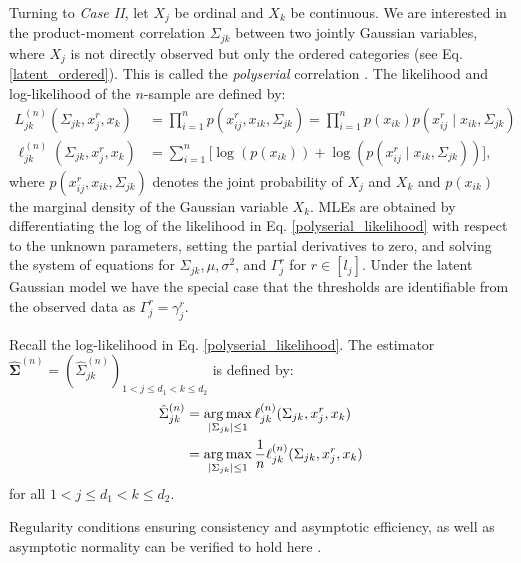 Turning to \textit{Case II}, let $X_j$ be ordinal and $X_k$ be continuous. We are interested in the product-moment correlation $\Sigma_{jk}$ between two jointly Gaussian variables, where $X_j$ is not directly observed but only the ordered categories (see Eq. \eqref{latent_ordered}). This is called the \textit{polyserial} correlation \citep{Olsson82}. The likelihood and log-likelihood of the $n$-sample are defined by:
\begin{equation}\label{polyserial_likelihood}
    \begin{split}
        L_{jk}^{(n)}(\Sigma_{jk}, x_j^r,x_k) &= \prod_{i=1}^n p(x^r_{ij},x_{ik}, \Sigma_{jk}) = \prod_{i=1}^n p(x_{ik})p(x^r_{ij} \mid x_{ik}, \Sigma_{jk}) \\
        \ell_{jk}^{(n)}(\Sigma_{jk}, x^r_j,x_k) &= \sum_{i=1}^n \big[\log(p(x_{ik})) + \log(p(x^r_{ij} \mid x_{ik}, \Sigma_{jk}))\big],
    \end{split}
\end{equation}
where $p(x_{ij}^{r},x_{ik}, \Sigma_{jk})$ denotes the joint probability of  $X_j$ and $X_k$ and $p(x_{ik})$ the marginal density of the Gaussian variable $X_k$. MLEs are obtained by differentiating the log of the likelihood in Eq. \eqref{polyserial_likelihood} with respect to the unknown parameters, setting the partial derivatives to zero, and solving the system of equations for $\Sigma_{jk}, \mu, \sigma^2$, and $\Gamma_j^r$ for $r \in [l_j]$. Under the latent Gaussian model we have the special case that the thresholds are identifiable from the observed data as \(\Gamma_j^r = \gamma_j^r\).

\begin{definition}\label{definition_case2}
    Recall the log-likelihood in Eq. \eqref{polyserial_likelihood}. The estimator $\hat{\mathbf{\Sigma}}^{(n)} = (\hat{\Sigma}_{jk}^{(n)})_{1 < j \leq d_1 < k \leq d_2}$ is defined by:
    \begin{equation}
        \begin{split}
            \hat{\Sigma}_{jk}^{(n)} &= \argmax_{\Abs{\Sigma_{jk}} \leq 1} \ell_{jk}^{(n)}(\Sigma_{jk}, x^r_j,x_k) \\
            &= \argmax_{\Abs{\Sigma_{jk}} \leq 1} \frac{1}{n} \ell_{jk}^{(n)}(\Sigma_{jk}, x^r_j,x_k)
        \end{split}
    \end{equation}
    for all $1 < j \leq d_1 < k \leq d_2$.
\end{definition}
\noindent Regularity conditions ensuring consistency and asymptotic efficiency, as well as asymptotic normality can be verified to hold here \citep{Cox74}.

